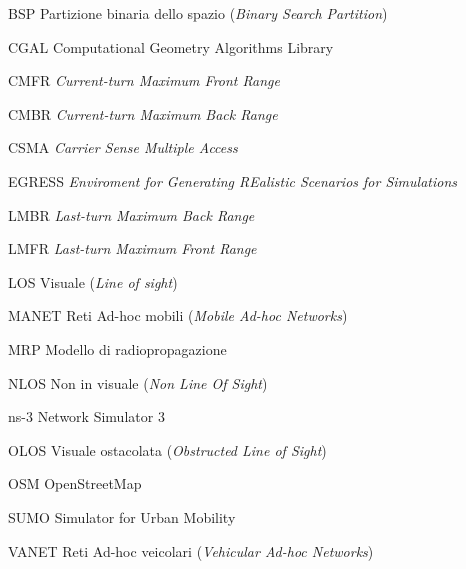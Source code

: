 \begin{abbreviations}

\item[BSP] Partizione binaria dello spazio (\textit{Binary Search Partition})
\item[CGAL] Computational Geometry Algorithms Library
\item[CMFR] \textit{Current-turn Maximum Front Range}
\item[CMBR] \textit{Current-turn Maximum Back Range}
\item[CSMA] \textit{Carrier Sense Multiple Access}
\item[EGRESS] \textit{Enviroment for Generating REalistic Scenarios for Simulations}
\item[LMBR] \textit{Last-turn Maximum Back Range}
\item[LMFR] \textit{Last-turn Maximum Front Range}
\item[LOS] Visuale (\textit{Line of sight})
\item[MANET] Reti Ad-hoc mobili (\textit{Mobile Ad-hoc Networks})
\item[MRP] Modello di radiopropagazione
\item[NLOS] Non in visuale (\textit{Non Line Of Sight})
\item[ns-3] Network Simulator 3
\item[OLOS] Visuale ostacolata (\textit{Obstructed Line of Sight})
\item[OSM] OpenStreetMap
\item[SUMO] Simulator for Urban Mobility
\item[VANET] Reti Ad-hoc veicolari (\textit{Vehicular Ad-hoc Networks})

\end{abbreviations}

